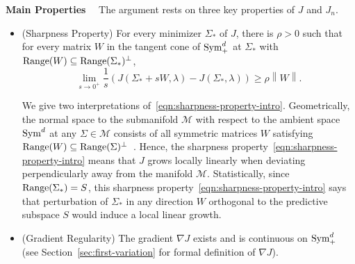 \documentclass[sn-mathphys-num]{sn-jnl}%
\numberwithin{equation}{section}
\newcommand{\norm}[1]{\left\|{#1}\right\|} %
\newcommand{\matrixnorm}[1]{\left|\!\left|\!\left|{#1}
  \right|\!\right|\!\right|} %
\newcommand{\Range}{{\rm Range}}
\newcommand{\grad}{\nabla}
\newcommand{\Sym}{{\rm \mathrm{Sym}}}
\theoremstyle{thmstyleone}%
\theoremstyle{thmstyletwo}%
\theoremstyle{thmstylethree}%
\begin{document}
\noindent\noindent
\textbf{Main Properties}~~
The argument rests on three key properties of $J$ and $J_n$. \vspace{.5em}
\begin{itemize}
\item (Sharpness Property) 	
	For every minimizer $\Sigma_*$ of $J$, there is $\rho > 0$ such that 
	for every matrix $W$ in the tangent cone of  $\Sym_+^d$ at $\Sigma_*$
	with $\Range(W) \subseteq \Range(\Sigma_*)^\perp$, 
	\begin{equation}
	\label{eqn:sharpness-property-intro}
		\lim_{s \to 0^+} \frac{1}{s} (J(\Sigma_* + sW, \lambda) - J(\Sigma_*, \lambda)) \ge \rho \norm{W}.
	\end{equation} 
	
	We give two interpretations of~\eqref{eqn:sharpness-property-intro}. Geometrically, the normal space to the submanifold 
	$\mathcal{M}$ with respect to the ambient space $\Sym^d$ at any $\Sigma \in \mathcal{M}$
	consists of all symmetric matrices $W$ satisfying $\Range(W) \subseteq \Range(\Sigma)^\perp$~\cite{HiriartMa12}. Hence, 
	the sharpness property~\eqref{eqn:sharpness-property-intro} means that
	$J$ grows locally linearly when deviating perpendicularly away from the manifold $\mathcal{M}$. 
	Statistically, since $\Range(\Sigma_*) = S$, this sharpness property~\eqref{eqn:sharpness-property-intro} 
	says that perturbation of $\Sigma_*$ in any direction $W$ orthogonal to the predictive 
	subspace $S$ would induce a local linear growth. 
	

\vspace{.5em}
\item (Gradient Regularity) The gradient $\grad J$ exists and is continuous on $\Sym_+^d$
(see Section~\ref{sec:first-variation} for formal definition of $\grad J$).



\end{itemize}
\end{document}
